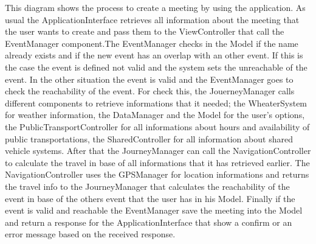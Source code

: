 \begin{figure}[H]
\end{figure}This diagram shows the process to create a meeting by using the application. As usual the ApplicationInterface retrieves all information about the meeting that the user wants to create and pass them to the ViewController that call the EventManager component.The EventManager checks in the Model if the name already exists and if the new event has an overlap with an other event. If this is the case the event is defined not valid and the system sets the unreachable of the event. In the other situation the event is valid and the EventManager goes to check the reachability of the event. For check this, the JouerneyManager calls different components to retrieve informations that it needed; the WheaterSystem for weather information, the DataManager and the Model for the user’s options, the PublicTransportController for all informations about hours and availability of public transportations, the SharedController for all information about shared vehicle systems. After that the JourneyManager can call the NavigationController to calculate the travel in base of all informations that it has retrieved earlier. The NavigationController uses the GPSManager for location informations and returns the travel info to the JourneyManager that calculates the reachability of the event in base of the others event that the user has in his Model. Finally if the event is valid and reachable the EventManager save the meeting into the Model and return a response for the ApplicationInterface that show a confirm or an error message based on the received response.

